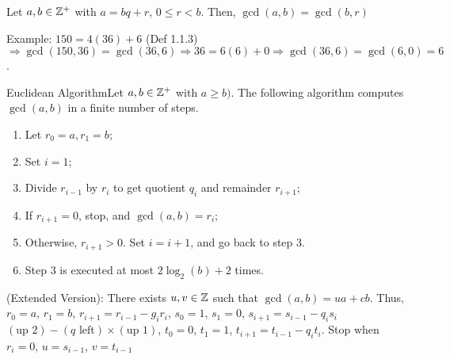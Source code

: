 \begin{theorem}
    {}Let $a,b \in \mathbb{Z}^+$ with $a = bq + r$, $0 \leq r < b$. Then, $\gcd(a,b) = \gcd(b,r)$
\end{theorem}


Example: $150 = 4(36) + 6$ (Def 1.1.3) $\Rightarrow \gcd(150,36) = \gcd(36,6) \Rightarrow 36 = 6(6) + 0 \Rightarrow \gcd(36,6) = \gcd(6,0) = 6$. \\

\begin{theorem}
    {Euclidean Algorithm}Let $a,b \in \mathbb{Z}^+$ with $a \geq b)$. The following algorithm computes $\gcd(a,b)$ in a finite number of steps. \begin{enumerate}
        \item Let $r_0 = a, r_1 = b$;
        \item Set $i = 1$;
        \item Divide $r_{i - 1}$ by $r_i$ to get quotient $q_i$ and remainder $r_{i + 1}$;
        \item If $r_{i + 1} = 0$, stop, and $\gcd(a,b) = r_i$;
        \item Otherwise, $r_{i + 1} > 0$. Set $i = i + 1$, and go back to step 3.
        \item Step 3 is executed at most $2\log_2(b) + 2$ times.
    \end{enumerate}
    (Extended Version): There exists $u,v \in \mathbb{Z}$ such that $\gcd(a,b) = ua + cb$. Thus, $r_0 = a$, $r_1 = b$, $r_{i + 1} = r_{i - 1} - g_ir_i$, $s_0 = 1$, $s_1 = 0$, $s_{i + 1} = s_{i - 1} - q_is_i$ $(\text{up } 2) - (q\text{ left}) \times (\text{up } 1)$, $t_0 = 0$, $t_1 = 1$, $t_{i + 1} = t_{i - 1} - q_it_i$. Stop when $r_i = 0$, $u = s_{i - 1}$, $v = t_{i - 1}$
\end{theorem}

